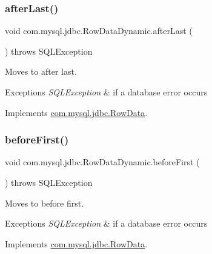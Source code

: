 \subsubsection{\texorpdfstring{after\+Last()}{afterLast()}}
{\footnotesize\ttfamily void com.\+mysql.\+jdbc.\+Row\+Data\+Dynamic.\+after\+Last (\begin{DoxyParamCaption}{ }\end{DoxyParamCaption}) throws S\+Q\+L\+Exception}

Moves to after last.


\begin{DoxyExceptions}{Exceptions}
{\em S\+Q\+L\+Exception} & if a database error occurs \\
\hline
\end{DoxyExceptions}


Implements \mbox{\hyperlink{interfacecom_1_1mysql_1_1jdbc_1_1_row_data_a465a997f2fddb9de5ee12340944084fc}{com.\+mysql.\+jdbc.\+Row\+Data}}.

\mbox{\label{classcom_1_1mysql_1_1jdbc_1_1_row_data_dynamic_a16cbf687cace7fe4bf5701e9233c733f}} 
\subsubsection{\texorpdfstring{before\+First()}{beforeFirst()}}
{\footnotesize\ttfamily void com.\+mysql.\+jdbc.\+Row\+Data\+Dynamic.\+before\+First (\begin{DoxyParamCaption}{ }\end{DoxyParamCaption}) throws S\+Q\+L\+Exception}

Moves to before first.


\begin{DoxyExceptions}{Exceptions}
{\em S\+Q\+L\+Exception} & if a database error occurs \\
\hline
\end{DoxyExceptions}


Implements \mbox{\hyperlink{interfacecom_1_1mysql_1_1jdbc_1_1_row_data_a3c1836b8c63ae7d859b8b0f1613ef244}{com.\+mysql.\+jdbc.\+Row\+Data}}.

\mbox{\label{classcom_1_1mysql_1_1jdbc_1_1_row_data_dynamic_a09397f78f848111ad10ddc5f75664d54}} 
